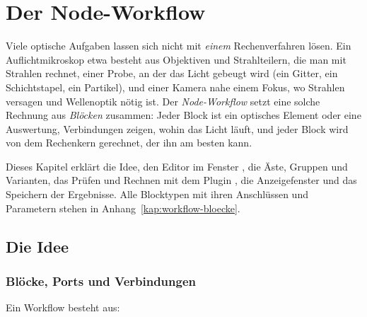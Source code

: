\chapter{Der Node-Workflow}\label{kap:workflow}

Viele optische Aufgaben lassen sich nicht mit \emph{einem} Rechenverfahren lösen. Ein
Auflichtmikroskop etwa besteht aus Objektiven und Strahlteilern, die man mit Strahlen rechnet,
einer Probe, an der das Licht gebeugt wird (ein Gitter, ein Schichtstapel, ein Partikel), und
einer Kamera nahe einem Fokus, wo Strahlen versagen und Wellenoptik nötig ist. Der
\emph{Node-Workflow} setzt eine solche Rechnung aus \emph{Blöcken} zusammen: Jeder Block ist ein
optisches Element oder eine Auswertung, Verbindungen zeigen, wohin das Licht läuft, und jeder
Block wird von dem Rechenkern gerechnet, der ihn am besten kann.

Dieses Kapitel erklärt die Idee, den Editor im Fenster , die Äste, Gruppen und
Varianten, das Prüfen und Rechnen mit dem Plugin , die Anzeigefenster und das
Speichern der Ergebnisse. Alle Blocktypen mit ihren Anschlüssen und Parametern stehen in
Anhang~\ref{kap:workflow-bloecke}.

\section{Die Idee}\label{sec:workflow-idee}

\subsection{Blöcke, Ports und Verbindungen}

Ein Workflow besteht aus:

